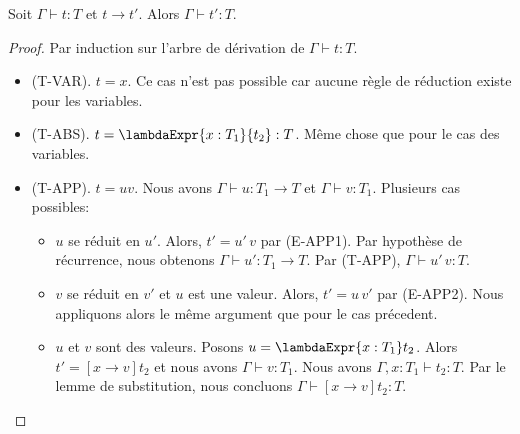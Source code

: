 \begin{theorem} 
  \label{thm:simply-typed-lambda-calculus-preservation}
  Soit $\Gamma \vdash t : T$ et $t \rightarrow t'$. Alors $\Gamma \vdash t' :
  T$.
\end{theorem}

\begin{proof}
  \label{proof:simply-typed-lambda-calculus-preservation}
  Par induction sur l'arbre de dérivation de $\Gamma \vdash t : T$.
  \begin{itemize}
  \item (T-VAR). $t = x$. Ce cas n'est pas possible car aucune règle de
    réduction existe pour les variables.
  \item (T-ABS). $t = \lambdaExpr{x : T_{1}}{t_{2}} : T$. Même chose que pour le
    cas des variables.
  \item (T-APP). $t = u v$. Nous avons $\Gamma
    \vdash u : T_{1} \rightarrow T$ et $\Gamma \vdash v : T_{1}$. Plusieurs cas possibles:
    \begin{itemize}
    \item $u$ se réduit en $u'$. Alors, $t' = u' \, v$ par (E-APP1). Par hypothèse
      de récurrence, nous
      obtenons $\Gamma \vdash u' : T_{1} \rightarrow T$. Par (T-APP),
      $\Gamma \vdash u' \, v : T$.
    \item $v$ se réduit en $v'$ et $u$ est une valeur. Alors, $t' = u \, v'$ par
      (E-APP2). Nous appliquons alors le même argument que pour le cas précedent.
    \item $u$ et $v$ sont des valeurs. Posons $u = \lambdaExpr{x : T_{1}} t_{2}$.
      Alors $t' = [x \rightarrow v]t_{2}$ et nous avons $\Gamma \vdash v :
      T_{1}$. Nous avons $\Gamma, x : T_{1} \vdash t_{2}
      : T$. Par le lemme de
      substitution, nous concluons $\Gamma \vdash [x \rightarrow v]t_{2} : T$.
    \end{itemize}
  \end{itemize}
\end{proof}
